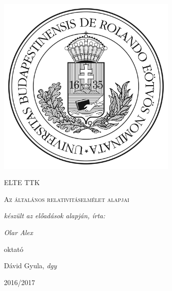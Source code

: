 \documentclass[a4paper,12pt]{article}
\begin{document}
\linespread{1.2}

\begin{titlepage}

	\centering
	\includegraphics[width=0.66\textwidth]{elte.jpg}\par\vspace{1cm}
	{\scshape\LARGE ELTE TTK \par}
	\vspace{2cm}
	{\scshape\Large Az általános relativitáselmélet alapjai\par}
	\vspace{1.5cm}
	{\large\itshape készült az előadások alapján, írta: \par}
	\vspace{1cm}
	{\large\itshape Olar Alex\par}
	\vfill
	oktató\par
	\vspace{0.5cm}
	{\Large Dávid Gyula, \itshape{dgy}}

	\vfill

	{\large 2016/2017 \par}
\end{titlepage}

\begin{abstract}
Ez a jegyzet \itshape{Dávid Gyula} előadássorozata alapján készült a 2016/17-es tanév második féléveben. A jegyzet bővítése tervben van. Az előadássorozat 3 féléven keresztül végig kíséri a most II. évfolyamot egészen a BSc végéig. Ezen összefoglaló célja számomra az ismétlés, majd közkinccsé tétel. 
\end{abstract}

\vfill
\end{document}

